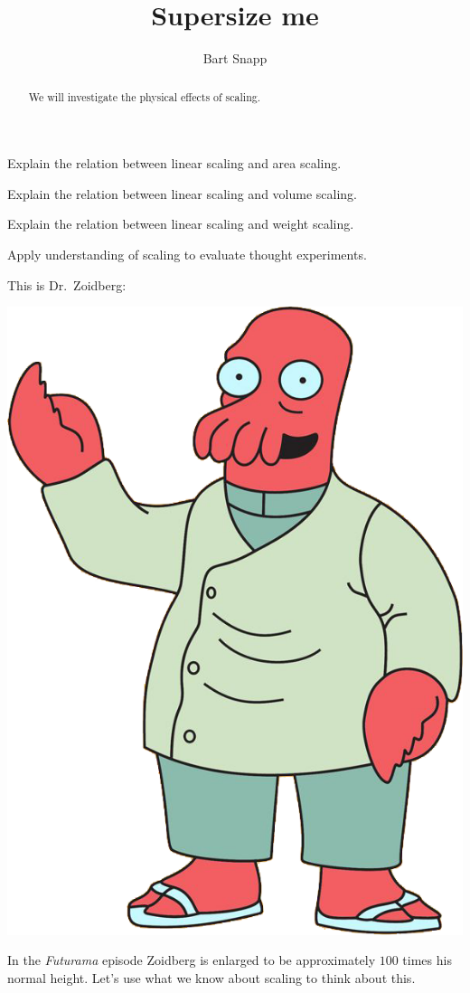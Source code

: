 \documentclass[handout,nooutcomes,noauthor]{ximera}
\title{Supersize me}
\author{Bart Snapp}
\begin{document}
\begin{abstract}
  We will investigate the physical effects of scaling.
\end{abstract}
\maketitle


\begin{listOutcomes}
\item Explain the relation between linear scaling and area scaling.
\item Explain the relation between linear scaling and volume scaling.
\item Explain the relation between linear scaling and weight scaling.
\item Apply understanding of scaling to evaluate thought experiments.
\end{listOutcomes}

This is Dr.\ Zoidberg:

\begin{center}
  \includegraphics[width=.3\textwidth]{zoidberg.png}
\end{center}

In the \textit{Futurama} episode  Zoidberg is enlarged to be
approximately $100$ times his normal height. Let's use what we know
about scaling to think about this.

\mynewpage
\end{document}
